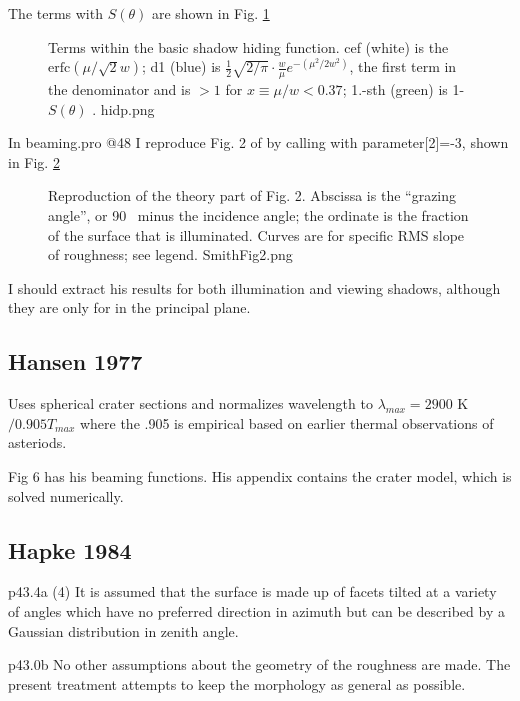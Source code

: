 \documentclass{article}
\newcommand{\erfc}{\mathrm{erfc}}  %
\begin{document}
The terms with $S(\theta)$ are shown in Fig.
\ref{hidp}
\begin{figure}[!ht] 
\caption[Terms within the shadow function]{Terms within the basic shadow hiding
  function. cef (white) is the $ \erfc \left( \mu / \sqrt{2} w \right)$; d1
  (blue) is $\frac{1}{2} \sqrt{2/\pi} \cdot \frac{w}{\mu}
  e^{-(\mu^2/2w^2)}$, the first term in the denominator and is $>1$
  for $x\equiv \mu/w < 0.37$; 1.-sth (green) is 1-$S(\theta)$ .
\label{hidp}  hidp.png  }
\end{figure} 

In beaming.pro @48 I reproduce Fig. 2 of  by calling
 with parameter[2]=-3, shown in Fig.  \ref{SmithFig2}
\begin{figure}[!ht] 
\caption[Smith Fig. 2]{Reproduction of the theory part of 
  Fig. 2. Abscissa is the ``grazing angle'', or 90\qd~ minus the incidence
  angle; the ordinate is the fraction of the surface that is illuminated. Curves
  are for specific RMS slope of roughness; see legend. \label{SmithFig2}
  SmithFig2.png }
\end{figure} 

 I should extract his results for both illumination and viewing shadows,
 although they are only for in the principal plane.

\subsection{Hansen  1977} %
Uses spherical crater sections and normalizes wavelength to $\lambda_{max} =2900
$ \um \qd K $/0.905 T_{max}$ where the .905 is empirical based on earlier
thermal observations of asteriods.

Fig 6 has his beaming functions.  His appendix contains the crater model, which
is solved numerically.

\subsection{Hapke 1984} %

p43.4a \bq (4) It is assumed that the surface is made up of facets tilted at a
variety of angles which have no preferred direction in azimuth but can be
described by a Gaussian distribution in zenith angle. \eq 

p43.0b \bq No other assumptions about the geometry of the roughness are
made. The present treatment attempts to keep the morphology as general as
possible.
\end{document}
